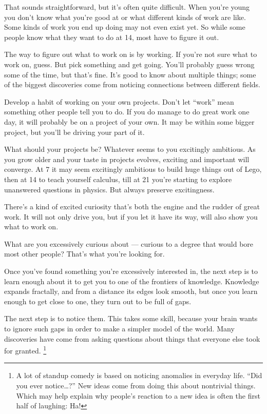 \documentclass[12pt]{book}
\begin{document}
That sounds straightforward, but it's often quite difficult. When you're
young you don't know what you're good at or what different kinds of work
are like. Some kinds of work you end up doing may not even exist yet. So
while some people know what they want to do at 14, most have to figure
it out.

The way to figure out what to work on is by working. If you're not sure
what to work on, guess. But pick something and get going. You'll
probably guess wrong some of the time, but that's fine. It's good to
know about multiple things; some of the biggest discoveries come from
noticing connections between different fields.

Develop a habit of working on your own projects. Don't let ``work'' mean
something other people tell you to do. If you do manage to do great work
one day, it will probably be on a project of your own. It may be within
some bigger project, but you'll be driving your part of it.

What should your projects be? Whatever seems to you excitingly
ambitious. As you grow older and your taste in projects evolves,
exciting and important will converge. At 7 it may seem excitingly
ambitious to build huge things out of Lego, then at 14 to teach yourself
calculus, till at 21 you're starting to explore unanswered questions in
physics. But always preserve excitingness.

There's a kind of excited curiosity that's both the engine and the
rudder of great work. It will not only drive you, but if you let it have
its way, will also show you what to work on.

What are you excessively curious about --- curious to a degree that
would bore most other people? That's what you're looking for.

Once you've found something you're excessively interested in, the next
step is to learn enough about it to get you to one of the frontiers of
knowledge. Knowledge expands fractally, and from a distance its edges
look smooth, but once you learn enough to get close to one, they turn
out to be full of gaps.

The next step is to notice them. This takes some skill, because your
brain wants to ignore such gaps in order to make a simpler model of the
world. Many discoveries have come from asking questions about things
that everyone else took for granted. \footnote{A lot of standup comedy is based on noticing anomalies in
everyday life. ``Did you ever notice\ldots?'' New ideas come from doing
this about nontrivial things. Which may help explain why people's
reaction to a new idea is often the first half of laughing: Ha!}
\end{document}

